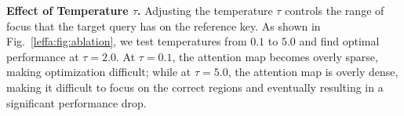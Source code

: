 

\noindent \textbf{Effect of Temperature $\tau$.}
Adjusting the temperature $\tau$ controls the range of focus that the target query has on the reference key.
As shown in Fig.~\ref{leffa:fig:ablation}, we test temperatures from $0.1$ to $5.0$ and find optimal performance at $\tau = 2.0$.
At $\tau = 0.1$, the attention map becomes overly sparse, making optimization difficult; while at $\tau = 5.0$, the attention map is overly dense, making it difficult to focus on the correct regions and eventually resulting in a significant performance drop.



